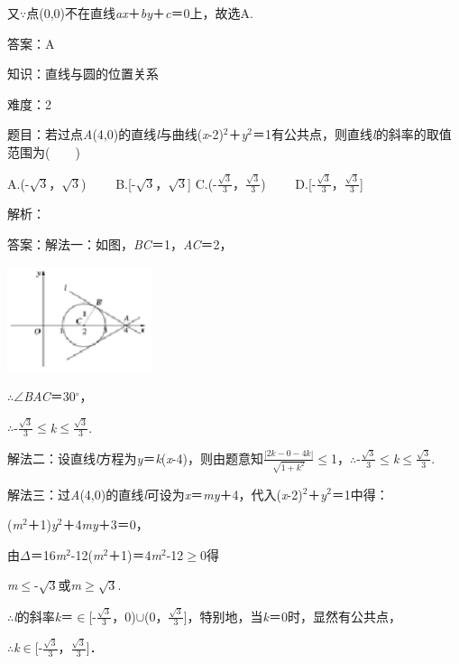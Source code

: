 \documentclass{article} %
\begin{document}
又$\mathrm{\because}$点(0,0)不在直线\textit{ax}＋\textit{by}＋\textit{c}＝0上，故选A.

答案：A

知识：直线与圆的位置关系

难度：2

题目：若过点\textit{A}(4,0)的直线\textit{l}与曲线(\textit{x}-2)${}^{2}$＋\textit{y}${}^{2}$＝1有公共点，则直线\textit{l}的斜率的取值范围为(　　)

A.(-$\sqrt{3}$，$\sqrt{3}$)　　 B.[-$\sqrt{3}$，$\sqrt{3}$] C.(-$\frac{\sqrt{3}}{3}$，$\frac{\sqrt{3}}{3}$)　　 D.[-$\frac{\sqrt{3}}{3}$，$\frac{\sqrt{3}}{3}$]

解析：

答案：解法一：如图，\textit{BC}＝1，\textit{AC}＝2，

\includegraphics*[width=1.67in, height=1.21in, keepaspectratio=false]{image293}

$\mathrm{\therefore}$$\mathrm{\angle}$\textit{BAC}＝30$\mathrm{{}^\circ}$，

$\mathrm{\therefore}$-$\frac{\sqrt{3}}{3}$$\mathrm{\le}$\textit{k}$\mathrm{\le}$$\frac{\sqrt{3}}{3}$.

解法二：设直线\textit{l}方程为\textit{y}＝\textit{k}(\textit{x}-4)，则由题意知$\frac{|2k-0-4k|}{\sqrt{1+k^2}}$$\mathrm{\le}$1，$\mathrm{\therefore}$-$\frac{\sqrt{3}}{3}$$\mathrm{\le}$\textit{k}$\mathrm{\le}$$\frac{\sqrt{3}}{3}$.

解法三：过\textit{A}(4,0)的直线\textit{l}可设为\textit{x}＝\textit{my}＋4，代入(\textit{x}-2)${}^{2}$＋\textit{y}${}^{2}$＝1中得：

(\textit{m}${}^{2}$＋1)\textit{y}${}^{2}$＋4\textit{my}＋3＝0，

由$\Delta$＝16\textit{m}${}^{2}$-12(\textit{m}${}^{2}$＋1)＝4\textit{m}${}^{2}$-12$\mathrm{\ge}$0得

\textit{m}$\mathrm{\le}$-$\sqrt{3}$或\textit{m}$\mathrm{\ge}\sqrt{3}$.

$\mathrm{\therefore}$\textit{l}的斜率\textit{k}＝$\mathrm{\in}$[-$\frac{\sqrt{3}}{3}$，0)$\mathrm{\cup}$(0，$\frac{\sqrt{3}}{3}$]，特别地，当\textit{k}＝0时，显然有公共点，

$\mathrm{\therefore}$\textit{k}$\mathrm{\in}$[-$\frac{\sqrt{3}}{3}$，$\frac{\sqrt{3}}{3}$]．
\end{document}
